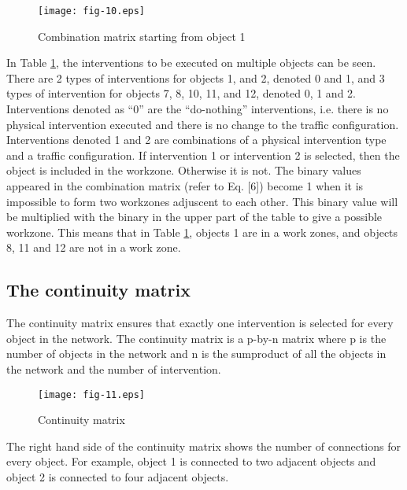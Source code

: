 \documentclass[10pt]{article}
\begin{document}
\begin{figure}[h]
\begin{center}

\caption{Combination matrix starting from object
1}\texttt{[image: fig-10.eps]}\label{fig:4}
\end{center}
\end{figure}

In Table \ref{fig:4}, the interventions to be executed on multiple objects can
be seen. There are 2 types of interventions for objects 1, and 2, denoted 0 and
1, and 3 types of intervention for objects 7, 8, 10, 11, and 12, denoted 0, 1 and
2. Interventions denoted as ``0'' are the ``do-nothing'' interventions, i.e.
there is no physical intervention executed and there is no change to the traffic
configuration. Interventions denoted 1 and 2 are combinations of a physical
intervention type and a traffic configuration. If intervention 1 or intervention
2 is selected, then the object is included in the workzone. Otherwise it is not.
The binary values appeared in the combination matrix (refer to Eq. [6]) become 1
when it is impossible to form two workzones adjuscent to each other. This binary
value will be multiplied with the binary in the upper part of the table to give a
possible workzone. This means that in Table \ref{fig:4}, objects 1 are in a work
zones, and objects 8, 11 and 12 are not in a work zone.

\subsection{The continuity matrix}

The continuity matrix ensures that exactly one intervention is selected for
every object in the network. The continuity matrix is a p-by-n matrix where p is
the number of objects in the network and n is the sumproduct of all the objects
in the network and the number of intervention.

\begin{figure}[h]
\begin{center}

\caption{Continuity matrix}\texttt{[image: fig-11.eps]}
\end{center}
\end{figure}

The right hand side of the continuity matrix shows the number of connections for
every object. For example, object 1 is connected to two adjacent objects and
object 2 is connected to four adjacent objects.
\end{document}
